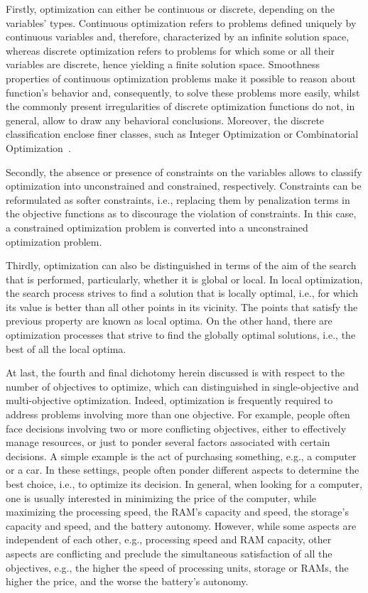 	Firstly, optimization can either be continuous or discrete, depending on the variables' types. Continuous optimization refers to problems defined uniquely by continuous variables and, therefore, characterized by an infinite solution space, whereas discrete optimization refers to problems for which some or all their variables are discrete, hence yielding a finite solution space. Smoothness properties of continuous optimization problems make it possible to reason about function's behavior and, consequently, to solve these problems more easily, whilst the commonly present irregularities of discrete optimization functions do not, in general, allow to draw any behavioral conclusions. Moreover, the discrete classification enclose finer classes, such as Integer Optimization or Combinatorial Optimization~\cite{Nemhauser1988}. 
	
	Secondly, the absence or presence of constraints on the variables allows to classify optimization into unconstrained and constrained, respectively. Constraints can be reformulated as softer constraints, i.e., replacing them by penalization terms in the objective functions as to discourage the violation of constraints. In this case, a constrained optimization problem is converted into a unconstrained optimization problem.
	
	Thirdly, optimization can also be distinguished in terms of the aim of the search that is performed, particularly, whether it is global or local. In local optimization, the search process strives to find a solution that is locally optimal, i.e., for which its value is better than all other points in its vicinity. The points that satisfy the previous property are known as local optima. On the other hand, there are optimization processes that strive to find the globally optimal solutions, i.e., the best of all the local optima.

	At last, the fourth and final dichotomy herein discussed is with respect to the number of objectives to optimize, which can distinguished in single-objective and multi-objective optimization. Indeed, optimization is frequently required to address problems involving more than one objective. For example, people often face decisions involving two or more conflicting objectives, either to effectively manage resources, or just to ponder several factors associated with certain decisions. A simple example is the act of purchasing something, e.g., a computer or a car. In these settings, people often ponder different aspects to determine the best choice, i.e., to optimize its decision. In general, when looking for a computer, one is usually interested in minimizing the price of the computer, while maximizing the processing speed, the RAM's capacity and speed, the storage's capacity and speed, and the battery autonomy. However, while some aspects are independent of each other, e.g., processing speed and RAM capacity, other aspects are conflicting and preclude the simultaneous satisfaction of all the objectives, e.g., the higher the speed of processing units, storage or RAMs, the higher the price, and the worse the battery's autonomy.
	 
